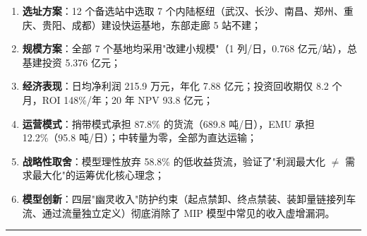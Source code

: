 \documentclass[12pt,a4paper,fontset=none]{ctexart}
\begin{document}
\begin{enumerate}[leftmargin=*]
    \item \textbf{选址方案}：12 个备选站中选取 7 个内陆枢纽（武汉、长沙、南昌、郑州、重庆、贵阳、成都）建设快运基地，东部走廊 5 站不建；
    \item \textbf{规模方案}：全部 7 个基地均采用"改建小规模"（1 列/日，0.768 亿元/站），总基建投资 5.376 亿元；
    \item \textbf{经济表现}：日均净利润 215.9 万元，年化 7.88 亿元；投资回收期仅 8.2 个月，ROI 148\%/年；20 年 NPV 93.8 亿元；
    \item \textbf{运营模式}：捎带模式承担 87.8\% 的货流（689.8 吨/日），EMU 承担 12.2\%（95.8 吨/日）；中转量为零，全部为直达运输；
    \item \textbf{战略性取舍}：模型理性放弃 58.8\% 的低收益货流，验证了"利润最大化 $\neq$ 需求最大化"的运筹优化核心理念；
    \item \textbf{模型创新}：四层"幽灵收入"防护约束（起点禁卸、终点禁装、装卸量链接列车流、通过流量独立定义）彻底消除了 MIP 模型中常见的收入虚增漏洞。
\end{enumerate}

\vspace{12pt}
\begin{center}
\rule{0.5\textwidth}{0.4pt}
\end{center}
\end{document}
